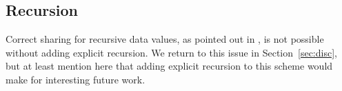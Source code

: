 \subsection{Recursion}

Correct sharing for recursive data values, as pointed out in
\cite{ariola1995call}, is not possible without adding explicit recursion. We
return to this issue in Section~\ref{sec:disc}, but at least mention here that
adding explicit recursion to this scheme would make for interesting future work.
